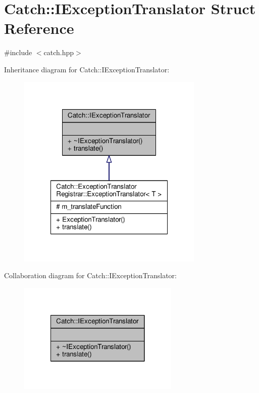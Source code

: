 \hypertarget{struct_catch_1_1_i_exception_translator}{\section{Catch\-:\-:I\-Exception\-Translator Struct Reference}
\label{struct_catch_1_1_i_exception_translator}
}


{\ttfamily \#include $<$catch.\-hpp$>$}



Inheritance diagram for Catch\-:\-:I\-Exception\-Translator\-:
\nopagebreak
\begin{figure}[H]
\begin{center}
\leavevmode
\includegraphics[width=252pt]{struct_catch_1_1_i_exception_translator__inherit__graph}
\end{center}
\end{figure}


Collaboration diagram for Catch\-:\-:I\-Exception\-Translator\-:
\nopagebreak
\begin{figure}[H]
\begin{center}
\leavevmode
\includegraphics[width=218pt]{struct_catch_1_1_i_exception_translator__coll__graph}
\end{center}
\end{figure}

